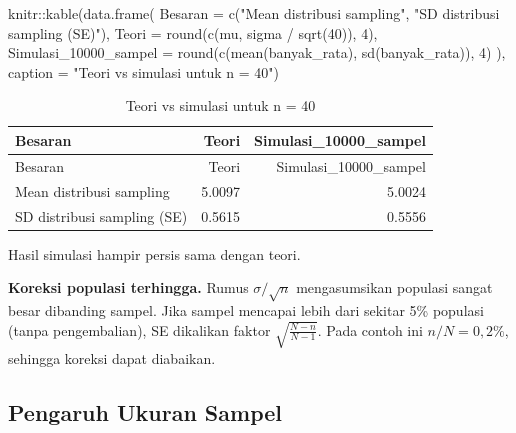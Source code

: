 \documentclass[
  indonesian,
  letterpaper,
]{book}
\newenvironment{Shaded}{\begin{snugshade}}{\end{snugshade}}
\newcommand{\AttributeTok}[1]{\textcolor[rgb]{0.40,0.45,0.13}{#1}}
\newcommand{\DecValTok}[1]{\textcolor[rgb]{0.68,0.00,0.00}{#1}}
\newcommand{\FunctionTok}[1]{\textcolor[rgb]{0.28,0.35,0.67}{#1}}
\newcommand{\NormalTok}[1]{\textcolor[rgb]{0.00,0.23,0.31}{#1}}
\newcommand{\SpecialCharTok}[1]{\textcolor[rgb]{0.37,0.37,0.37}{#1}}
\newcommand{\StringTok}[1]{\textcolor[rgb]{0.13,0.47,0.30}{#1}}
\begin{document}
\begin{Shaded}
\begin{Highlighting}[]
\NormalTok{knitr}\SpecialCharTok{::}\FunctionTok{kable}\NormalTok{(}\FunctionTok{data.frame}\NormalTok{(}
  \AttributeTok{Besaran =} \FunctionTok{c}\NormalTok{(}\StringTok{"Mean distribusi sampling"}\NormalTok{, }\StringTok{"SD distribusi sampling (SE)"}\NormalTok{),}
  \AttributeTok{Teori   =} \FunctionTok{round}\NormalTok{(}\FunctionTok{c}\NormalTok{(mu, sigma }\SpecialCharTok{/} \FunctionTok{sqrt}\NormalTok{(}\DecValTok{40}\NormalTok{)), }\DecValTok{4}\NormalTok{),}
  \AttributeTok{Simulasi\_10000\_sampel =} \FunctionTok{round}\NormalTok{(}\FunctionTok{c}\NormalTok{(}\FunctionTok{mean}\NormalTok{(banyak\_rata), }\FunctionTok{sd}\NormalTok{(banyak\_rata)), }\DecValTok{4}\NormalTok{)}
\NormalTok{), }\AttributeTok{caption =} \StringTok{"Teori vs simulasi untuk n = 40"}\NormalTok{)}
\end{Highlighting}
\end{Shaded}

\begin{longtable}[]{@{}lrr@{}}
\caption{Teori vs simulasi untuk n = 40}\tabularnewline
\toprule\noalign{}
Besaran & Teori & Simulasi\_10000\_sampel \\
\midrule\noalign{}
\endfirsthead
\toprule\noalign{}
Besaran & Teori & Simulasi\_10000\_sampel \\
\midrule\noalign{}
\endhead
\bottomrule\noalign{}
\endlastfoot
Mean distribusi sampling & 5.0097 & 5.0024 \\
SD distribusi sampling (SE) & 0.5615 & 0.5556 \\
\end{longtable}

Hasil simulasi hampir persis sama dengan teori.

\textbf{Koreksi populasi terhingga.} Rumus \(\sigma/\sqrt{n}\)
mengasumsikan populasi sangat besar dibanding sampel. Jika sampel
mencapai lebih dari sekitar 5\% populasi (tanpa pengembalian), SE
dikalikan faktor \(\sqrt{\frac{N-n}{N-1}}\). Pada contoh ini
\(n/N = 0{,}2\%\), sehingga koreksi dapat diabaikan.

\subsection{Pengaruh Ukuran Sampel}\label{pengaruh-ukuran-sampel}
\end{document}
